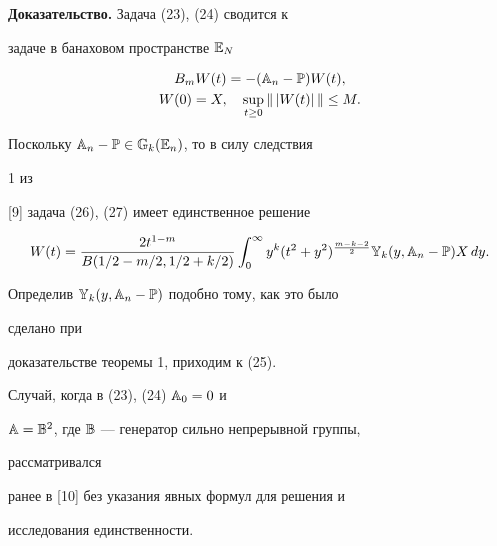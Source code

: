  


{\bf Доказательство.} Задача (23), (24) сводится к 


задаче в банаховом пространстве $\Bbb E_N$ 


\begin{gather} 


B_m W(t)=-(\Bbb A_n-\Bbb P)W(t), \\ 


W(0)=X,\quad \sup_{t\ge 0}\|\,|W(t)|\,\|\le M. 


\end{gather} 


Поскольку $\Bbb A_n-\Bbb P\in\Bbb G_k(\Bbb E_n)$, то в силу следствия 


1 из 


[9] задача (26), (27) имеет единственное решение 


$$


W(t)=\frac{2t^{1-m}}{B(1/2-m/2,1/2+k/2)}\int^\infty_0 


y^k(t^2+y^2)^{\frac{m-k-2}{2}}\Bbb Y_k(y,\Bbb A_n-\Bbb P)X\,dy. 


$$


Определив $\Bbb Y_k(y,\Bbb A_n-\Bbb P)$ подобно тому, как это было 


сделано при 


доказательстве теоремы 1, приходим к (25). 


 


\begin{note} Случай, когда в (23), (24) $\Bbb A_0=0$ и 


$\Bbb A=\Bbb B^2$, где $\Bbb B$ --- генератор сильно непрерывной группы, 


рассматривался 


ранее в [10] без указания явных формул для решения и  


исследования единственности. 


\end{note} 


 


